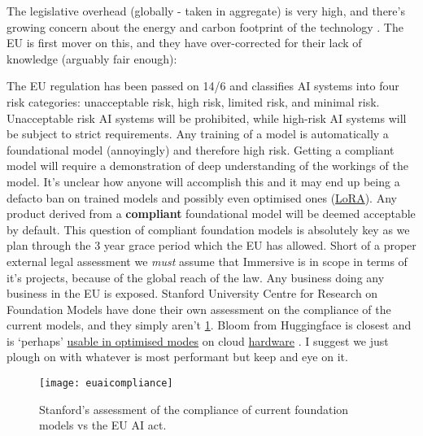 The legislative overhead (globally - taken in aggregate) is very high, and there's growing concern about the energy and carbon footprint of the technology \cite{wu2022sustainable}. The EU is first mover on this, and they have over-corrected for their lack of knowledge (arguably fair enough):\par
The EU regulation has been passed on 14/6 and classifies AI systems into four risk categories: unacceptable risk, high risk, limited risk, and minimal risk. Unacceptable risk AI systems will be prohibited, while high-risk AI systems will be subject to strict requirements. Any training of a model is automatically a foundational model (annoyingly) and therefore high risk. Getting a compliant model will require a demonstration of deep understanding of the workings of the model. It's unclear how anyone will accomplish this and it may end up being a defacto ban on trained models and possibly even optimised ones (\hyperref[sec:LoRA]{LoRA}). Any product derived from a \textbf{compliant} foundational model will be deemed acceptable by default. This question of compliant foundation models is absolutely key as we plan through the 3 year grace period which the EU has allowed. Short of a proper external legal assessment we \textit{must} assume that Immersive is in scope in terms of it's projects, because of the global reach of the law. Any business doing any business in the EU is exposed. Stanford University Centre for Research on Foundation Models have done their own assessment on the compliance of the current models, and they simply aren't \ref{fig:euAIcompliance}. Bloom from Huggingface is closest and is `perhaps' \href{https://huggingface.co/BelleGroup/BELLE_BLOOM_GPTQ_4BIT}{usable in optimised modes} on cloud \href{https://lambdalabs.com/nvidia-h100-gpus}{hardware} \cite{dettmers2022case}. I suggest we just plough on with whatever is most performant but keep and eye on it.

\begin{figure}[H]
    \centering
    \texttt{[image: euaicompliance]}
    \caption{Stanford's assessment of the compliance of current foundation models vs the EU AI act.}
    \label{fig:euAIcompliance}
\end{figure}

